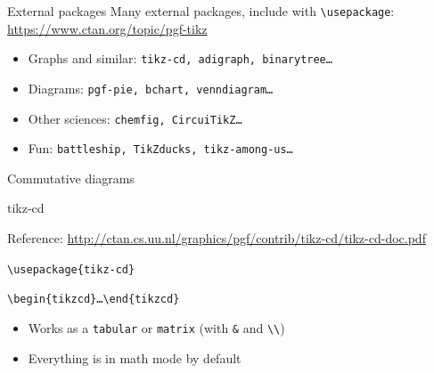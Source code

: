 \documentclass[11pt]{beamer}
\newcommand{\bs}{\textbackslash}
\begin{document}
\begin{frame}{External packages}
  Many external packages, include with \texttt{\bs usepackage}:
  \url{https://www.ctan.org/topic/pgf-tikz}

  \vspace{0.3cm}
  \begin{itemize}
    \item Graphs and similar: \texttt{tikz-cd, adigraph, binarytree\dots}
    \item Diagrams: \texttt{pgf-pie, bchart, venndiagram\dots}
    \item Other sciences: \texttt{chemfig, CircuiTikZ\dots}
    \item Fun: \texttt{battleship, TikZducks, tikz-among-us\dots}
  \end{itemize}
\end{frame}

\begin{frame}[fragile]{Commutative diagrams}
  \begin{center}
  \end{center}
\end{frame}

\begin{frame}{tikz-cd}

  Reference:
  {\footnotesize
  \url{http://ctan.cs.uu.nl/graphics/pgf/contrib/tikz-cd/tikz-cd-doc.pdf}}

  \vspace{0.7cm}
  \texttt{\bs usepackage\{tikz-cd\}}

  \vspace{0.2cm}
  \texttt{\bs begin\{tikzcd\}\dots \bs end\{tikzcd\}}

  \vspace{0.5cm}
  \begin{itemize}
    \item Works as a \texttt{tabular} or \texttt{matrix} (with \texttt{\&} and
          \texttt{\bs\bs})
    \item Everything is in math mode by default
  \end{itemize}
\end{frame}
\end{document}
